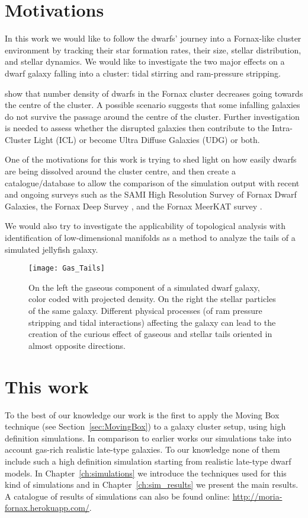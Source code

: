 \section{Motivations}
\label{sec:motivations}
In this work we would like to follow the dwarfs’ journey into a Fornax-like cluster environment by tracking their star formation rates, their size, stellar distribution, and stellar dynamics.
We would like to investigate the two major effects on a dwarf galaxy falling into a cluster: tidal stirring and ram-pressure stripping.

\citet{Venhola2018} show that number density of dwarfs in the Fornax cluster decreases going towards the centre of the cluster.
A possible scenario suggests that some infalling galaxies do not survive the passage around the centre of the cluster.
Further investigation is needed to assess  whether the disrupted galaxies then contribute to the Intra-Cluster Light (ICL) or become Ultra Diffuse Galaxies (UDG) or both.

One of the motivations for this work is trying to shed light on how easily dwarfs are being dissolved around the cluster centre,
and then create a catalogue/database to allow the comparison of the simulation output with recent and ongoing surveys such as the SAMI High Resolution Survey of Fornax Dwarf Galaxies, \citep{Owers2019, Scott2018} the Fornax Deep Survey \citep{Venhola2018}, and the Fornax MeerKAT survey \citep{Loni2021}.

We would also try to investigate the applicability of topological analysis with identification of low-dimensional manifolds as a method to analyze the tails of a simulated jellyfish galaxy.

\begin{figure}
  \centering
  \texttt{[image: Gas\_Tails]}
  \caption{On the left the gaseous component of a simulated dwarf galaxy, color coded with projected density.
    On the right the stellar particles of the same galaxy.
   Different physical processes (of ram pressure stripping and tidal interactions) affecting the galaxy can lead to the creation of the curious effect of gaseous and stellar tails oriented in almost opposite directions.}
  \label{fig:tails}
\end{figure}


\section{This work}
To the best of our knowledge our work is the first to apply the Moving Box technique (see Section~\ref{sec:MovingBox}) to a galaxy cluster setup, using high definition simulations.
In comparison to earlier works our simulations take into account gas-rich realistic late-type galaxies.
To our knowledge none of them include such a high definition simulation starting from realistic late-type dwarf models.
In Chapter~\ref{ch:simulations} we introduce the techniques used for this kind of simulations and in Chapter~\ref{ch:sim_results} we present the main results.
A catalogue of results of simulations can also be found online: \url{http://moria-fornax.herokuapp.com/}.

